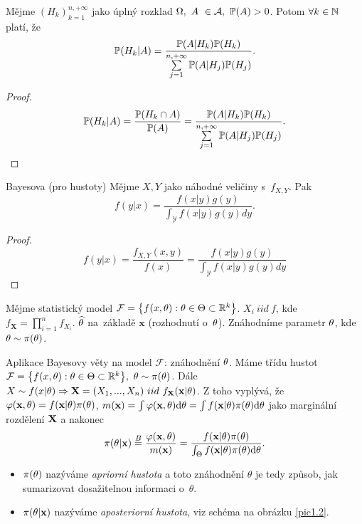 \begin{theorem}[Bayesova] 
	Mějme $(H_k)_{k=1}^{n,+\infty}$ jako úplný rozklad $\Omega,~A~\in \mathcal{A} , ~\mathbb{P}(A)>0$. Potom $\forall k\in\mathbb{N}$ platí, že 
	\[
	\mathbb{P}(H_k|A)=\frac{\mathbb{P}(A|H_k)\mathbb{P}(H_k)}{\sum\limits_{j=1}^{n,+\infty}\mathbb{P}(A|H_j)\mathbb{P}(H_j)}.
	\]
	\begin{proof}
		$$\mathbb{P}(H_k|A)=\frac{\mathbb{P}(H_k\cap A)}{\mathbb{P}(A)}=\frac{\mathbb{P}(A|H_k)\mathbb{P}(H_k)}{\sum\limits_{j=1}^{n,+\infty}\mathbb{P}(A|H_j)\mathbb{P}(H_j)}.$$
	\end{proof}
\end{theorem}
\begin{theorem}{Bayesova (pro hustoty)}
	Mějme $X,Y$ jako náhodné veličiny s~$f_{X,Y}$. Pak
	$$ f(y|x)=\frac{f(x|y)g(y)}{\int_{\mathcal{Y}}f(x|y)g(y)dy}. $$
\begin{proof}
$$ f(y|x)=\frac{f_{X,Y}(x,y)}{f(x)}=\frac{f(x|y)g(y)}{\int_{\mathcal{Y}}f(x|y)g(y)dy} $$
\end{proof}

\end{theorem}

Mějme statistický model $\mathcal{F}=\big\{ f(x,\theta):\theta\in\Theta\subset\mathbb{R}^k \big\}$.
$X_i~iid~f$, kde $f_\textbf{X}=\prod_{i=1}^n f_{X_i}$. $\widehat{\theta}$ na~základě $\textbf{x}$ (rozhodnutí o~$\theta$). Znáhodníme parametr $\theta$, kde $\theta\sim\pi(\theta)$.

Aplikace Bayesovy věty na model $\mathcal{F}$: znáhodnění $\theta$. Máme třídu hustot $\mathcal{F}=\big\{f(x,\theta):\theta\in\Theta\subset\mathbb{R}^k\big\},~\theta\sim\pi(\theta)$. Dále $X\sim f(x|\theta)\Rightarrow \textbf{X}=(X_1,...,X_n)~iid~f_{\textbf{X}}(\textbf{x}|\theta)$.
Z toho vyplývá, že $\varphi(\textbf{x},\theta)=f(\textbf{x}|\theta)\pi(\theta)$, $m(\textbf{x})=\int\varphi(\textbf{x},\theta)\mathrm{d} \theta=\int f(\textbf{x}|\theta)\pi(\theta)\mathrm{d}\theta$ jako marginální rozdělení $\textbf{X}$ a nakonec 
	$$ \pi(\theta|\textbf{x})\stackrel{B}{=}\frac{\varphi(\textbf{x},\theta)}{m(\textbf{x})}=\frac{f(\textbf{x}|\theta)\pi(\theta)}{\int_\Theta f(\textbf{x}|\theta)\pi(\theta)\mathrm{d}\theta}. $$
	\begin{itemize}
	\item 	$\pi(\theta)$ nazýváme \textit{apriorní hustota} a toto znáhodnění $\theta$ je tedy způsob, jak sumarizovat dosažitelnou informaci o~$\theta$.
	\item   $\pi(\theta|\textbf{x})$ nazýváme \textit{aposteriorní hustota}, viz schéma na obrázku \ref{pic1.2}.
	\end{itemize}

